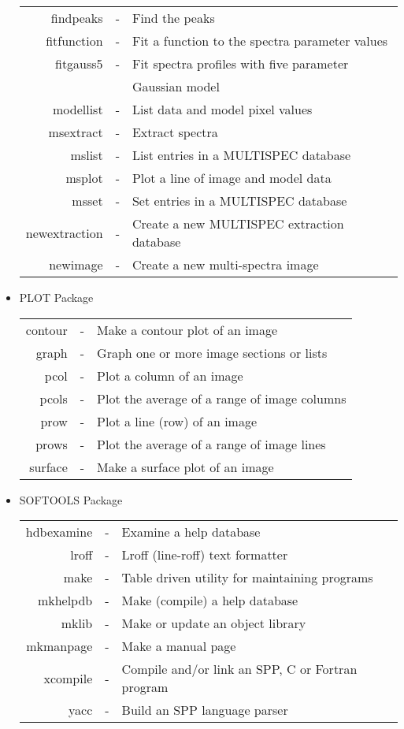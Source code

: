 \begin{itemize}
\begin{tabular}{rcl}
      findpeaks & - & Find the peaks\\
    fitfunction & - & Fit a function to the spectra parameter values\\
      fitgauss5 & - & Fit spectra profiles with five parameter \\
		&&	Gaussian model\\
      modellist & - & List data and model pixel values\\
      msextract & - & Extract spectra\\
         mslist & - & List entries in a MULTISPEC database\\
         msplot & - & Plot a line of image and model data\\
          msset & - & Set entries in a MULTISPEC database\\
  newextraction & - & Create a new MULTISPEC extraction database\\
       newimage & - & Create a new multi-spectra image

\end{tabular}

\item PLOT Package \\

\begin{tabular}{rcl}

	contour & - & Make a contour plot of an image\\
	  graph & - & Graph one or more image sections or lists\\
	   pcol & - & Plot a column of an image\\
	  pcols & - & Plot the average of a range of image columns\\
	   prow & - & Plot a line (row) of an image\\
	  prows & - & Plot the average of a range of image lines\\
	surface & - & Make a surface plot of an image
\end{tabular}

\clearpage
\item SOFTOOLS Package \\

\begin{tabular}{rcl}

     hdbexamine & - & Examine a help database\\
	  lroff & - & Lroff (line-roff) text formatter\\
	   make & - & Table driven utility for maintaining programs\\
       mkhelpdb & - & Make (compile) a help database\\
	  mklib & - & Make or update an object library\\
      mkmanpage & - & Make a manual page\\
       xcompile & - & Compile and/or link an SPP, C or Fortran program\\
	   yacc & - & Build an SPP language parser


\end{tabular}
\end{itemize}

